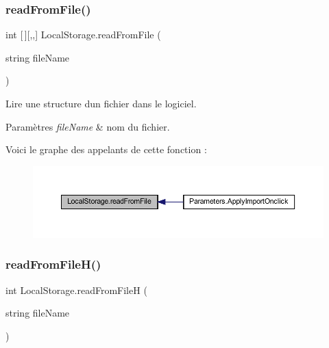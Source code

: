 \subsubsection{\texorpdfstring{read\+From\+File()}{readFromFile()}}
{\footnotesize\ttfamily int \mbox{[}$\,$\mbox{]}\mbox{[},,\mbox{]} Local\+Storage.\+read\+From\+File (\begin{DoxyParamCaption}\item[{string}]{file\+Name }\end{DoxyParamCaption})\hspace{0.3cm}{\ttfamily [inline]}}



Lire une structure d\textquotesingle{}un fichier dans le logiciel. 


\begin{DoxyParams}{Paramètres}
{\em file\+Name} & nom du fichier.\\
\hline
\end{DoxyParams}
Voici le graphe des appelants de cette fonction \+:\nopagebreak
\begin{figure}[H]
\begin{center}
\leavevmode
\includegraphics[width=350pt]{class_local_storage_a200c8f22ceed88238703411e2c0f1e05_icgraph}
\end{center}
\end{figure}
\mbox{\label{class_local_storage_ab0e31baa14b85dc8a8bd21aa1d53ab09}} 
\subsubsection{\texorpdfstring{read\+From\+File\+H()}{readFromFileH()}}
{\footnotesize\ttfamily int Local\+Storage.\+read\+From\+FileH (\begin{DoxyParamCaption}\item[{string}]{file\+Name }\end{DoxyParamCaption})\hspace{0.3cm}{\ttfamily [inline]}}



